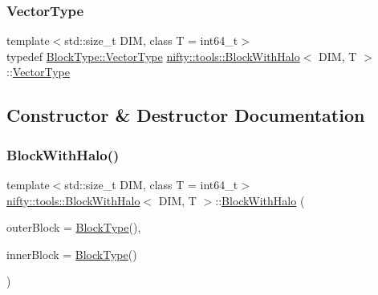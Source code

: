 \subsubsection{\texorpdfstring{Vector\+Type}{VectorType}}
{\footnotesize\ttfamily template$<$std\+::size\+\_\+t D\+IM, class T  = int64\+\_\+t$>$ \\
typedef \hyperlink{classnifty_1_1tools_1_1Block_aa077b4ebbf3e4e9b679d1957ca10ba32}{Block\+Type\+::\+Vector\+Type} \hyperlink{classnifty_1_1tools_1_1BlockWithHalo}{nifty\+::tools\+::\+Block\+With\+Halo}$<$ D\+IM, T $>$\+::\hyperlink{classnifty_1_1tools_1_1BlockWithHalo_a040d8a654eb42791c6e5fbd4dfd51b9f}{Vector\+Type}}



\subsection{Constructor \& Destructor Documentation}
\mbox{\label{classnifty_1_1tools_1_1BlockWithHalo_ad80f17f6eea4c3d40e61eda04134ffe6}} 
\subsubsection{\texorpdfstring{Block\+With\+Halo()}{BlockWithHalo()}}
{\footnotesize\ttfamily template$<$std\+::size\+\_\+t D\+IM, class T  = int64\+\_\+t$>$ \\
\hyperlink{classnifty_1_1tools_1_1BlockWithHalo}{nifty\+::tools\+::\+Block\+With\+Halo}$<$ D\+IM, T $>$\+::\hyperlink{classnifty_1_1tools_1_1BlockWithHalo}{Block\+With\+Halo} (\begin{DoxyParamCaption}\item[{const \hyperlink{classnifty_1_1tools_1_1BlockWithHalo_a98d2c04518f8902ab6d985feba605987}{Block\+Type} \&}]{outer\+Block = {\ttfamily \hyperlink{classnifty_1_1tools_1_1BlockWithHalo_a98d2c04518f8902ab6d985feba605987}{Block\+Type}()},  }\item[{const \hyperlink{classnifty_1_1tools_1_1BlockWithHalo_a98d2c04518f8902ab6d985feba605987}{Block\+Type} \&}]{inner\+Block = {\ttfamily \hyperlink{classnifty_1_1tools_1_1BlockWithHalo_a98d2c04518f8902ab6d985feba605987}{Block\+Type}()} }\end{DoxyParamCaption})\hspace{0.3cm}{\ttfamily [inline]}}



